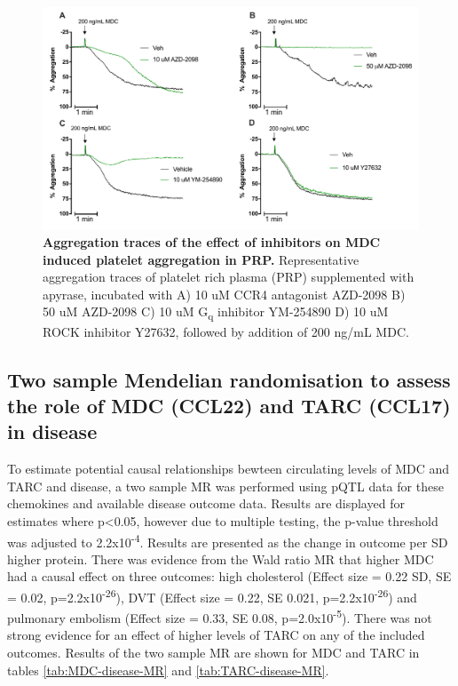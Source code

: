 \documentclass[11pt,twoside]{bristolthesis}
\begin{document}
\begin{figure}

{\centering \includegraphics[width=0.95\linewidth]{figure/Chemokines/Layouts/MDC_inhibitors_aggregation_traces} 

}

\caption[Aggregation traces of the effect of inhibitors on MDC induced platelet aggregation in PRP.]{\textbf{Aggregation traces of the effect of inhibitors on MDC induced platelet aggregation in PRP.} Representative aggregation traces of platelet rich plasma (PRP) supplemented with apyrase, incubated with A) 10 uM CCR4 antagonist AZD-2098 B) 50 uM AZD-2098 C) 10 uM G\textsubscript{q} inhibitor YM-254890 D) 10 uM ROCK inhibitor Y27632, followed by addition of 200 ng/mL MDC.}\label{fig:MDC-PRP-agg-trace}
\end{figure}
\hypertarget{two-sample-mendelian-randomisation-to-assess-the-role-of-mdc-ccl22-and-tarc-ccl17-in-disease}{%
\subsection{Two sample Mendelian randomisation to assess the role of MDC (CCL22) and TARC (CCL17) in disease}\label{two-sample-mendelian-randomisation-to-assess-the-role-of-mdc-ccl22-and-tarc-ccl17-in-disease}}

To estimate potential causal relationships bewteen circulating levels of MDC and TARC and disease, a two sample MR was performed using pQTL data for these chemokines and available disease outcome data. Results are displayed for estimates where p\textless0.05, however due to multiple testing, the p-value threshold was adjusted to 2.2x10\textsuperscript{-4}. Results are presented as the change in outcome per SD higher protein. There was evidence from the Wald ratio MR that higher MDC had a causal effect on three outcomes: high cholesterol (Effect size = 0.22 SD, SE = 0.02, p=2.2x10\textsuperscript{-26}), DVT (Effect size = 0.22, SE 0.021, p=2.2x10\textsuperscript{-26}) and pulmonary embolism (Effect size = 0.33, SE 0.08, p=2.0x10\textsuperscript{-5}). There was not strong evidence for an effect of higher levels of TARC on any of the included outcomes. Results of the two sample MR are shown for MDC and TARC in tables \ref{tab:MDC-disease-MR} and \ref{tab:TARC-disease-MR}.
\end{document}
